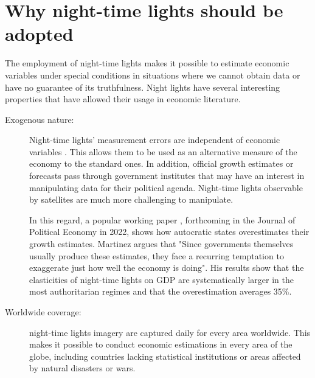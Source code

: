 \section{Why night-time lights should be adopted} %
The employment of night-time lights makes it possible to estimate economic variables under special conditions in situations where we cannot obtain data or have no guarantee of its truthfulness.
Night lights have several interesting properties that have allowed their usage in economic literature. 
\begin{description}
  \item[Exogenous nature:]
 Night-time lights' measurement errors are independent of economic variables \citep{hu2022illuminating}. This allows them to be used as an alternative measure of the economy to the standard ones. In addition, official growth estimates or forecasts pass through government institutes that may have an interest in manipulating data for their political agenda. Night-time lights observable by satellites are much more challenging to manipulate. 
 
In this regard, a popular working paper \citep{martinez2018much}, forthcoming in the Journal of Political Economy in 2022, shows how autocratic states overestimates their growth estimates. Martinez argues that "Since governments themselves usually produce these estimates, they face a recurring temptation to exaggerate just how well the economy is doing".
His results show that the elasticities of night-time lights on GDP are systematically larger in the most authoritarian regimes and that the overestimation averages 35\%.
\item[Worldwide coverage:] night-time lights imagery are captured daily for every area worldwide. This makes it possible to conduct economic estimations in every area of the globe, including countries lacking statistical institutions or areas affected by natural disasters or wars. 


\end{description}
